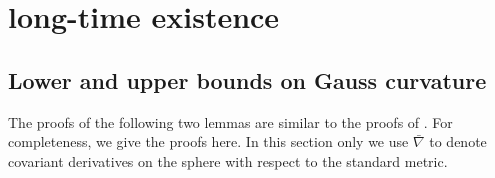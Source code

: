 \documentclass{amsart}
\theoremstyle{definition}
\theoremstyle{remark}
\numberwithin{equation}{section}
\begin{document}
\section{long-time existence}
\label{sec:long-time-existence}

\subsection{Lower and upper bounds on Gauss curvature}
\label{subsec:gauss-curvature-bounds}

The proofs of the following two lemmas are similar to the proofs of \cite[ Lemmas 4.1, 4.2]{Ivaki-Proc}. For completeness, we give the proofs here. In this section only we use $\bar{\nabla}$ to denote covariant derivatives on the sphere with respect to the standard metric.
\end{document}
